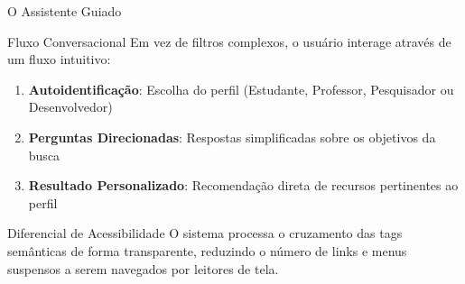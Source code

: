 \documentclass[aspectratio=169]{beamer}
\begin{document}
\begin{frame}{O Assistente Guiado}
    \begin{block}{Fluxo Conversacional}
        Em vez de filtros complexos, o usuário interage através de um fluxo intuitivo:
        \begin{enumerate}
            \item \textbf{Autoidentificação}: Escolha do perfil (Estudante, Professor, Pesquisador ou Desenvolvedor)
            \item \textbf{Perguntas Direcionadas}: Respostas simplificadas sobre os objetivos da busca
            \item \textbf{Resultado Personalizado}: Recomendação direta de recursos pertinentes ao perfil
        \end{enumerate}
    \end{block}

    \vspace{0.2cm}

    \begin{exampleblock}{Diferencial de Acessibilidade}
        O sistema processa o cruzamento das tags semânticas de forma transparente, reduzindo o número de links e menus suspensos a serem navegados por leitores de tela.
    \end{exampleblock}

\end{frame}
\end{document}

